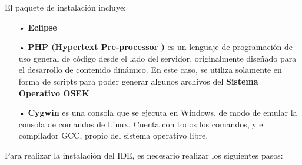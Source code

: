 \documentclass[12pt,letterpaper]{article}
\begin{document}
El paquete de instalación incluye:
\begin{enumerate}
\item[•] \textbf{Eclipse}
\item[•]\textbf{PHP (Hypertext Pre-processor )} es un lenguaje de programación de uso general de código desde el lado del servidor, originalmente diseñado para el desarrollo de contenido dinámico. En este caso, se utiliza solamente en forma de scripts para poder generar algunos archivos del \textbf{Sistema Operativo OSEK}
\item[•] \textbf{Cygwin} es una consola que se ejecuta en Windows, de modo de emular la consola de comandos de Linux. Cuenta con todos los comandos, y el compilador GCC, propio del sistema operativo libre.
\end{enumerate}
Para realizar la instalación del IDE, es necesario realizar los siguientes pasos:
\end{document}
